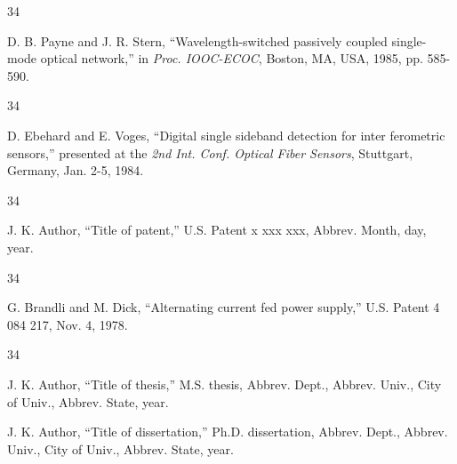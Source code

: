 \documentclass{IEEEjmw}
\begin{document}
\vspace*{-12pt}

\begin{thebibliography}{34}
\setcounter{enumiv}{21}

\bibitem{}D. B. Payne and J. R. Stern, ``Wavelength-switched passively coupled single-mode optical network,'' in {\em Proc. IOOC-ECOC}, Boston, MA, USA, 1985,
pp. 585-590. %

\end{thebibliography}

\vspace*{-12pt}

\begin{thebibliography}{34}
\setcounter{enumiv}{22}

\bibitem{}D. Ebehard and E. Voges, ``Digital single sideband detection for inter ferometric sensors,'' presented at the {\em 2nd Int. Conf. Optical Fiber Sensors}, Stuttgart, Germany, Jan. 2-5, 1984.
\end{thebibliography}

\vspace*{-12pt}
\begin{thebibliography}{34}
\item[]\hskip-18pt J. K. Author, ``Title of patent,'' U.S. Patent x xxx xxx, Abbrev. Month, day, year.
\end{thebibliography}\vspace*{-14pt}


\vspace*{-12pt}

\begin{thebibliography}{34}
\setcounter{enumiv}{23}

\bibitem{}G. Brandli and M. Dick, ``Alternating current fed power supply,'' U.S. Patent 4 084 217, Nov. 4, 1978.
\end{thebibliography}

\vspace*{-12pt}
\begin{thebibliography}{34}\itemindent-6.5pt
\item[a)] J. K. Author, ``Title of thesis,'' M.S. thesis, Abbrev. Dept., Abbrev. Univ., City of Univ., Abbrev. State, year.

\item[b)] J. K. Author, ``Title of dissertation,'' Ph.D. dissertation, Abbrev. Dept., Abbrev. Univ., City of Univ., Abbrev. State, year.
\end{thebibliography}\vspace*{-14pt}
\end{document}
